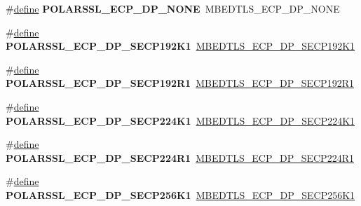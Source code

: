 \begin{DoxyCompactItemize}
\#\hyperlink{structdefine}{define} {\bfseries P\+O\+L\+A\+R\+S\+S\+L\+\_\+\+E\+C\+P\+\_\+\+D\+P\+\_\+\+N\+O\+NE}~M\+B\+E\+D\+T\+L\+S\+\_\+\+E\+C\+P\+\_\+\+D\+P\+\_\+\+N\+O\+NE
\item 
\mbox{\label{compat-1_83_8h_a72eaa55f0481d0e83260d12f4de9f22e}} 
\#\hyperlink{structdefine}{define} {\bfseries P\+O\+L\+A\+R\+S\+S\+L\+\_\+\+E\+C\+P\+\_\+\+D\+P\+\_\+\+S\+E\+C\+P192\+K1}~\hyperlink{ecp_8h_af79e530ea8f8416480f805baa20b1a2da0414bf86d7efb0e211214d9dddfb69d4}{M\+B\+E\+D\+T\+L\+S\+\_\+\+E\+C\+P\+\_\+\+D\+P\+\_\+\+S\+E\+C\+P192\+K1}
\item 
\mbox{\label{compat-1_83_8h_ae9816f49fbe5913dda9f2f6a6a70912e}} 
\#\hyperlink{structdefine}{define} {\bfseries P\+O\+L\+A\+R\+S\+S\+L\+\_\+\+E\+C\+P\+\_\+\+D\+P\+\_\+\+S\+E\+C\+P192\+R1}~\hyperlink{ecp_8h_af79e530ea8f8416480f805baa20b1a2dae5fcc335b9a458a68542c5b0e2a60971}{M\+B\+E\+D\+T\+L\+S\+\_\+\+E\+C\+P\+\_\+\+D\+P\+\_\+\+S\+E\+C\+P192\+R1}
\item 
\mbox{\label{compat-1_83_8h_afeed429a4d1763c977e7f85afb559791}} 
\#\hyperlink{structdefine}{define} {\bfseries P\+O\+L\+A\+R\+S\+S\+L\+\_\+\+E\+C\+P\+\_\+\+D\+P\+\_\+\+S\+E\+C\+P224\+K1}~\hyperlink{ecp_8h_af79e530ea8f8416480f805baa20b1a2dabae9bc9de43957062495162e603c0943}{M\+B\+E\+D\+T\+L\+S\+\_\+\+E\+C\+P\+\_\+\+D\+P\+\_\+\+S\+E\+C\+P224\+K1}
\item 
\mbox{\label{compat-1_83_8h_a64e835ef7af96291f5a7a0f8a64d36f1}} 
\#\hyperlink{structdefine}{define} {\bfseries P\+O\+L\+A\+R\+S\+S\+L\+\_\+\+E\+C\+P\+\_\+\+D\+P\+\_\+\+S\+E\+C\+P224\+R1}~\hyperlink{ecp_8h_af79e530ea8f8416480f805baa20b1a2da89c8d4502fa02eecd44f8de4831b38c8}{M\+B\+E\+D\+T\+L\+S\+\_\+\+E\+C\+P\+\_\+\+D\+P\+\_\+\+S\+E\+C\+P224\+R1}
\item 
\mbox{\label{compat-1_83_8h_a19d87918b65e013991efedfc3d089d6f}} 
\#\hyperlink{structdefine}{define} {\bfseries P\+O\+L\+A\+R\+S\+S\+L\+\_\+\+E\+C\+P\+\_\+\+D\+P\+\_\+\+S\+E\+C\+P256\+K1}~\hyperlink{ecp_8h_af79e530ea8f8416480f805baa20b1a2da6de9f87d43d7c29c7f91e9986ccfc25f}{M\+B\+E\+D\+T\+L\+S\+\_\+\+E\+C\+P\+\_\+\+D\+P\+\_\+\+S\+E\+C\+P256\+K1}
\item 
\mbox{\label{compat-1_83_8h_a14c3a9d71568ba446b529b67a1c57ce5}} 

\end{DoxyCompactItemize}
